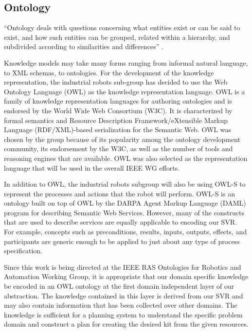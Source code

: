 \subsection{Ontology}
``Ontology deals with questions concerning what entities exist or can be said to exist, and how such entities can be grouped, related within a hierarchy, and subdivided according to similarities and differences'' \cite{ontologyDef}.

Knowledge models may take many forms ranging from informal natural language, to XML schemas, to ontologies.
For the development of the  knowledge representation, the industrial robots sub-group has decided to use the  Web Ontology Language (OWL) \cite{OWL} as the knowledge representation language. OWL is a family of knowledge representation languages for authoring ontologies and is endorsed by the World Wide Web Consortium (W3C). It is characterized by formal semantics and Resource Description Framework/eXtensible Markup Language (RDF/XML)-based serialization for the Semantic Web. OWL was chosen by the group because of its popularity among the ontology development community, its endorsement by the W3C, as well as the number of tools and reasoning engines that are available. OWL was also selected as the representation language that will be used in the overall IEEE WG efforts.

In addition to OWL, the industrial robots subgroup will also be using OWL-S \cite{Martin2012} to represent the processes and actions that the robot will perform. OWL-S is an ontology built on top of OWL by the DARPA Agent Markup Language (DAML) program \cite{damlWeb}
for describing Semantic Web Services. However, many of the constructs that are used to describe services are equally applicable to encoding our SVR. For example, concepts such as preconditions, results, inputs, outputs, effects, and participants are generic enough to be applied to just about any type of process specification.

Since this work is being directed at the IEEE RAS Ontologies for Robotics and Automation Working Group, it is appropriate that our  domain specific knowledge  be
encoded in an OWL ontology at the first domain independent  layer of our abstraction. The knowledge contained in this layer is derived from our SVR and may also contain
information that has been collected over other domains. The knowledge is sufficient for a planning system to understand the specific problem domain and construct
a plan for creating the desired kit from the given resources.

